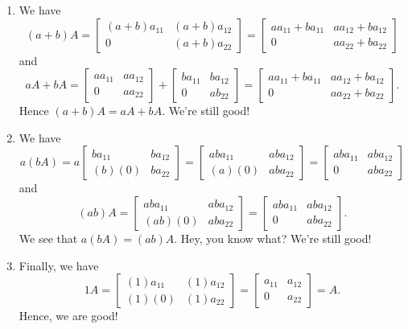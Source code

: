 \documentclass[12pt]{article}
\begin{document}
\begin{enumerate}
\begin{enumerate}[label=S\arabic*.]
				\item We have
					\[
						(a + b) A = \begin{bmatrix} (a + b) a_{11} & (a + b) a_{12} \\ 0 & (a + b) a_{22} \end{bmatrix} = \begin{bmatrix} a a_{11} + b a_{11} & a a_{12} + b a_{12} \\ 0 & a a_{22} + b a_{22} \end{bmatrix} 
					\]
				and
					\[
						aA + bA = \begin{bmatrix} a a_{11} & a a_{12} \\ 0 & a a_{22} \end{bmatrix} + \begin{bmatrix} b a_{11} & b a_{12} \\ 0 & a b_{22} \end{bmatrix} = \begin{bmatrix} aa_{11} + b a_{11} & a a_{12} + b a_{12} \\ 0 & a a_{22} + b a_{22} \end{bmatrix} .
					\]
				Hence $(a + b)A = aA + bA$. We're still good!
				\item We have
					\[
						a (bA) = a \begin{bmatrix} ba_{11} & b a_{12} \\ (b)(0) & b a_{22} \end{bmatrix} = \begin{bmatrix} ab a_{11} & ab a_{12} \\ (a)(0) & ab a_{22} \end{bmatrix} = \begin{bmatrix} ab a_{11} & ab a_{12} \\ 0 & ab a_{22} \end{bmatrix} 
					\]
				and
					\[
						(ab) A = \begin{bmatrix} ab a_{11} & ab a_{12} \\ (ab) (0) & ab a_{22} \end{bmatrix} = \begin{bmatrix} ab a_{11} & ab a_{12} \\ 0 & ab a_{22} \end{bmatrix} .
					\]
				We see that $a (bA) = (ab) A$. Hey, you know what? We're still good!
				\item Finally, we have
					\[
						1 A = \begin{bmatrix} (1) a_{11} & (1) a_{12} \\ (1) (0) & (1) a_{22} \end{bmatrix} = \begin{bmatrix} a_{11} & a_{12} \\ 0 & a_{22} \end{bmatrix} = A .
					\]
				Hence, we are good!
			\end{enumerate}


\end{enumerate}
\end{document}
